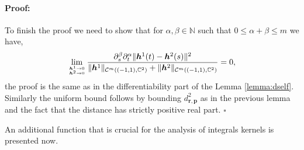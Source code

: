 \documentclass{article}
\newenvironment{proof}{\paragraph{Proof:}}{\hfill$\square$}
\newcommand{\IC}{{\mathbb C}}
\newcommand{\IN}{{\mathbb N}}
\newcommand{\bp}{{\bm p}}
\newcommand{\cmspace}[3]{\mathcal{C}^{#1} \left( #2, #3 \right)}
\newcommand{\bh}{\bm{h}}
\newcommand{\br}{\bm{r}}
\begin{document}
\begin{proof}
$$$$
To finish the proof we need to show that for $\alpha, \beta \in \IN$ such that $0 \leq \alpha + \beta \leq m$ we have,  
\begin{align*}
\lim_{\bh^1 \rightarrow 0 \atop \bh^2 \rightarrow 0 }\frac{\partial^\beta_s\partial^\alpha_t \| \bh^1(t)- \bh^2(s)\|^2}{\| \bh^1 \|_{\cmspace{m}{(-1,1)}{\IC^2}} + \|\bh^2\|_{\cmspace{m}{(-1,1)}{\IC^2}}} = 0 ,
\end{align*}
the proof is the same as in the differentiability part of the Lemma \ref{lemma:dself}. Similarly the uniform bound follows by bounding $d^2_{\br,\bp}$ as in the previous lemma and the fact that the distance has strictly positive real part. 
\end{proof}

An additional function that is crucial for the analysis of integrals kernels is presented now. 
\end{document}
